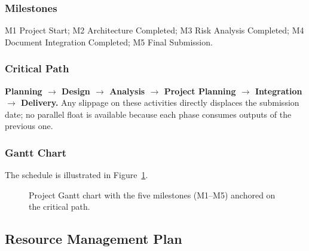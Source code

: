 \documentclass[conference,a4paper,10pt]{IEEEtran}
\begin{document}
\subsubsection*{Milestones}
M1 Project Start; M2 Architecture Completed; M3 Risk Analysis Completed;
M4 Document Integration Completed; M5 Final Submission.

\subsubsection*{Critical Path}
\textbf{Planning $\rightarrow$ Design $\rightarrow$ Analysis $\rightarrow$
Project Planning $\rightarrow$ Integration $\rightarrow$ Delivery.} Any
slippage on these activities directly displaces the submission date; no
parallel float is available because each phase consumes outputs of the
previous one.

\subsubsection*{Gantt Chart}
The schedule is illustrated in Figure~\ref{fig:gantt}.

\begin{figure}[H]
\centering
{}
\caption{Project Gantt chart with the five milestones (M1--M5) anchored on
the critical path.}
\label{fig:gantt}
\end{figure}

\subsection{Resource Management Plan}
\end{document}
